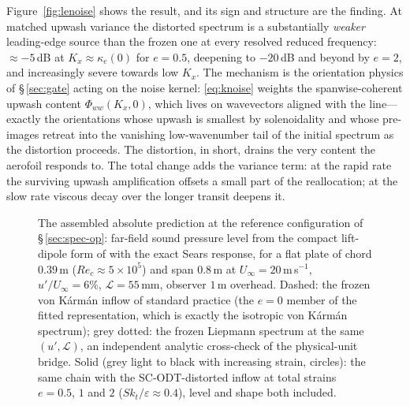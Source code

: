 \documentclass[11pt,a4paper]{article}
\begin{document}
Figure~\ref{fig:lenoise} shows the result, and its sign and structure
are the finding. At matched upwash variance the distorted spectrum is a
substantially \emph{weaker} leading-edge source than the frozen one at
every resolved reduced frequency: $\approx-5$\,dB at
$K_x\approx\kappa_e(0)$ for $e=0.5$, deepening to $-20$\,dB and beyond
by $e=2$, and increasingly severe towards low $K_x$. The mechanism is
the orientation physics of \S\,\ref{sec:gate} acting on the noise
kernel: \eqref{eq:knoise} weights the spanwise-coherent upwash content
$\Phi_{ww}(K_x,0)$, which lives on wavevectors aligned with the
line---exactly the orientations whose upwash is smallest by
solenoidality and whose pre-images retreat into the vanishing
low-wavenumber tail of the initial spectrum as the distortion
proceeds. The distortion, in short, drains the very content the
aerofoil responds to. The total change adds the variance term: at the
rapid rate the surviving upwash amplification offsets a small part of
the reallocation; at the slow rate viscous decay over the longer
transit deepens it.

\begin{figure}
  \centering
  \caption{The assembled absolute prediction at the reference
  configuration of \S\,\ref{sec:spec-op}: far-field sound pressure
  level from the compact lift-dipole form of \citet{Amiet1975} with
  the exact Sears response, for a flat plate of chord $0.39$\,m
  ($Re_c\approx5\times10^5$) and span $0.8$\,m at
  $U_\infty=20$\,m\,s$^{-1}$, $u'/U_\infty=6\%$,
  $\mathcal{L}=55$\,mm, observer $1$\,m overhead. Dashed: the frozen
  von K\'arm\'an inflow of standard practice (the $e=0$ member of the
  fitted representation, which is exactly the isotropic von K\'arm\'an
  spectrum); grey dotted: the frozen Liepmann spectrum at the same
  $(u',\mathcal{L})$, an independent analytic cross-check of the
  physical-unit bridge. Solid (grey light to black with increasing
  strain, circles): the same chain with the SC-ODT-distorted inflow at
  total strains $e=0.5$, $1$ and $2$
  ($Sk_t/\varepsilon\approx0.4$), level and shape both included.}
  \label{fig:amiet-abs}
\end{figure}
\end{document}
